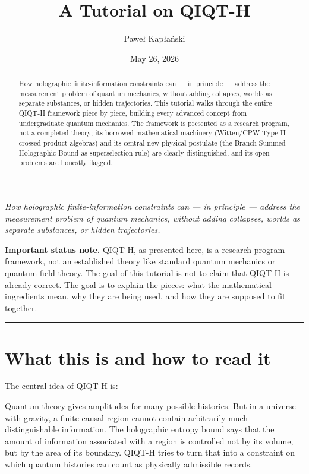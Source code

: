 \documentclass[11pt,a4paper]{article}
\title{A Tutorial on QIQT-H}
\author{Paweł Kapłański}
\date{May 26, 2026}
\newenvironment{qiqtquote}{\begin{mdframed}[style=quotestyle]}{\end{mdframed}}
\begin{document}
\maketitle

\begin{abstract}
\noindent How holographic finite-information constraints can — in principle —
address the measurement problem of quantum mechanics, without adding collapses,
worlds as separate substances, or hidden trajectories. This tutorial walks
through the entire QIQT-H framework piece by piece, building every advanced
concept from undergraduate quantum mechanics. The framework is presented as a
research program, not a completed theory; its borrowed mathematical machinery
(Witten/CPW Type II crossed-product algebras) and its central new physical
postulate (the Branch-Summed Holographic Bound as superselection rule) are
clearly distinguished, and its open problems are honestly flagged.
\end{abstract}

\tableofcontents
\newpage

\emph{How holographic finite-information constraints can — in principle — address the measurement problem of quantum mechanics, without adding collapses, worlds as separate substances, or hidden trajectories.}

\begin{qiqtquote}
\textbf{Important status note.} QIQT-H, as presented here, is a research-program framework, not an established theory like standard quantum mechanics or quantum field theory. The goal of this tutorial is not to claim that QIQT-H is already correct. The goal is to explain the pieces: what the mathematical ingredients mean, why they are being used, and how they are supposed to fit together.
\end{qiqtquote}

\medskip\hrule\medskip

\section{What this is and how to read it}

The central idea of QIQT-H is:

\begin{qiqtquote}
Quantum theory gives amplitudes for many possible histories. But in a universe with gravity, a finite causal region cannot contain arbitrarily much distinguishable information. The holographic entropy bound says that the amount of information associated with a region is controlled not by its volume, but by the area of its boundary. QIQT-H tries to turn that into a constraint on which quantum histories can count as physically admissible records.
\end{qiqtquote}
\end{document}
